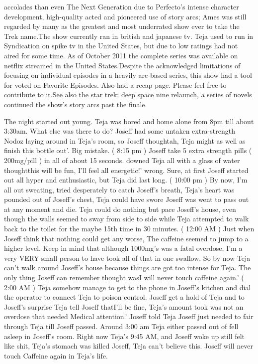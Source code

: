 \documentclass[12pt]{book}
\begin{document}
accolades than even The Next Generation due to Perfecto's intense character development, high-quality acted and pioneered use of story arcs; Ames was still regarded by many as the greatest and most underrated show ever to take the Trek name.The show currently ran in british and japanese tv. Teja used to run in Syndication on spike tv in the United States, but due to low ratings had not aired for some time. As of October 2011 the complete series was available on netflix streamed in the United States.Despite the acknowledged limitations of focusing on individual episodes in a heavily arc-based series, this show had a tool for voted on Favorite Episodes. Also had a recap page. Please feel free to contribute to it.See also the star trek: deep space nine relaunch, a series of novels continued the show's story arcs past the finale.



The night started out young. Teja was bored and home alone from 8pm till about 3:30am. What else was there to do? Joseff had some untaken extra-strength Nodoz laying around in Teja's room, so Joseff thoughtah, Teja might as well as finish this bottle out'. Big mistake. ( 8:15 pm ) Joseff take 5 extra strength pills ( 200mg/pill ) in all of about 15 seconds. downed Teja all with a glass of water thoughtthis will be fun, I'll feel all energetic!' wrong. Sure, at first Joseff started out all hyper and enthusiastic, but Teja did last long. ( 10:00 pm ) By now, I'm all out sweating, tried desperately to catch Joseff's breath, Teja's heart was pounded out of Joseff's chest, Teja could have swore Joseff was went to pass out at any moment and die. Teja could do nothing but pace Joseff's house, even though the walls seemed to sway from side to side while Teja attempted to walk back to the toilet for the maybe 15th time in 30 minutes. ( 12:00 AM ) Just when Joseff think that nothing could get any worse, The caffeine seemed to jump to a higher level. Keep in mind that although 1000mg's was a fatal overdose, I'm a very VERY small person to have took all of that in one swallow. So by now Teja can't walk around Joseff's house because things are got too intense for Teja. The only thing Joseff can remember thought wasI will never touch caffeine again.' ( 2:00 AM ) Teja somehow manage to get to the phone in Joseff's kitchen and dial the operator to connect Teja to poison control. Joseff get a hold of Teja and to Joseff's surprise Teja tell Joseff thatI'll be fine, Teja's amount took was not an overdose that needed Medical attention.' Joseff told Teja Joseff just needed to fair through Teja till Joseff passed. Around 3:00 am Teja either passed out of fell asleep in Joseff's room. Right now Teja's 9:45 AM, and Joseff woke up still felt like shit, Teja's stomach was killed Joseff, Teja can't believe this. Joseff will never touch Caffeine again in Teja's life.
\end{document}
